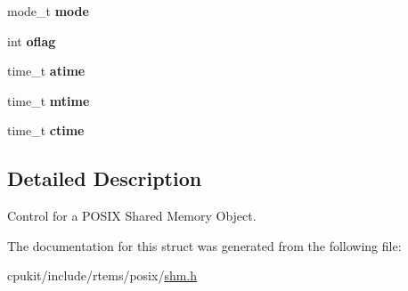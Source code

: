 \begin{DoxyCompactItemize}
mode\+\_\+t {\bfseries mode}
\item 
\mbox{\label{structPOSIX__Shm__Control_a455f4dcf41f39cdd3170a571397ee668}} 
int {\bfseries oflag}
\item 
\mbox{\label{structPOSIX__Shm__Control_abfcae59e742ac92ac68445cfe604c045}} 
time\+\_\+t {\bfseries atime}
\item 
\mbox{\label{structPOSIX__Shm__Control_a2e1bfe42c4a38fefb2d8f913dd0760d8}} 
time\+\_\+t {\bfseries mtime}
\item 
\mbox{\label{structPOSIX__Shm__Control_ab9a1b26ed5e07a5b4a9992e61011efbc}} 
time\+\_\+t {\bfseries ctime}
\end{DoxyCompactItemize}


\subsection{Detailed Description}
Control for a P\+O\+S\+IX Shared Memory Object. 

The documentation for this struct was generated from the following file\+:\begin{DoxyCompactItemize}
\item 
cpukit/include/rtems/posix/\mbox{\hyperlink{shm_8h}{shm.\+h}}\end{DoxyCompactItemize}
